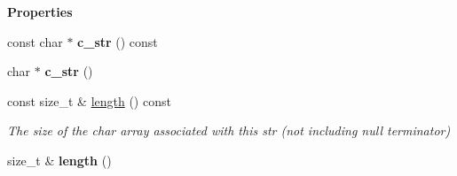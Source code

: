 \begin{Indent}\textbf{ Properties}\par
\begin{DoxyCompactItemize}
\item 
\mbox{\label{classrev_1_1_g_string_acf23614cd064df0eca7840e0bb533ead}} 
const char $\ast$ {\bfseries c\+\_\+str} () const
\item 
\mbox{\label{classrev_1_1_g_string_a4306ae979d42001018f08bdfa19c8f70}} 
char $\ast$ {\bfseries c\+\_\+str} ()
\item 
\mbox{\label{classrev_1_1_g_string_a56e29c2b7f505ace394729bfdbc4348c}} 
const size\+\_\+t \& \mbox{\hyperlink{classrev_1_1_g_string_a56e29c2b7f505ace394729bfdbc4348c}{length}} () const
\begin{DoxyCompactList}\small\item\em The size of the char array associated with this str (not including null terminator) \end{DoxyCompactList}\item 
\mbox{\label{classrev_1_1_g_string_af32eb3b3c592a25524eefb1a4ff34003}} 
size\+\_\+t \& {\bfseries length} ()
\end{DoxyCompactItemize}
\end{Indent}
